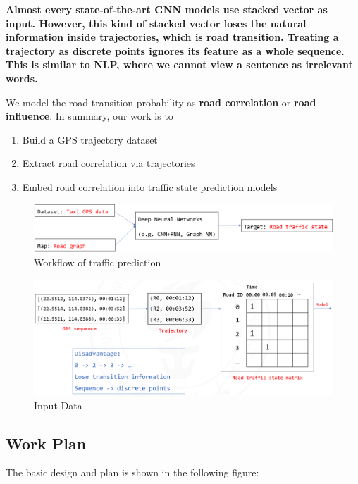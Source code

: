 \documentclass[fontset=none]{ctexart}
\theoremstyle{definition}
\theoremstyle{remark}
\begin{document}
\textbf{Almost every state-of-the-art GNN models use stacked vector\cite{lee2021short} as input.
However, this kind of stacked vector loses the natural information inside trajectories,
which is road transition. Treating a trajectory as discrete points ignores its feature as a
whole sequence. This is similar to NLP, where we cannot view a sentence as irrelevant words.}

We model the road transition probability as \textbf{road correlation} or \textbf{road influence}.
In summary, our work is to
\begin{enumerate}
  \item Build a GPS trajectory dataset
  \item Extract road correlation via trajectories
  \item Embed road correlation into traffic state prediction models
\end{enumerate}

\begin{figure}[htb]
  \centering
  \includegraphics[width=\textwidth]{images/mid/1-2.png}
  \caption{Workflow of traffic prediction}
  \label{fig: 1-2}
\end{figure}

\begin{figure}[htb]
  \centering
  \includegraphics[width=\textwidth]{images/mid/1-3.png}
  \caption{Input Data}
  \label{fig: 1-3}
\end{figure}

\subsection{Work Plan}
The basic design and plan is shown in the following figure:
\end{document}
